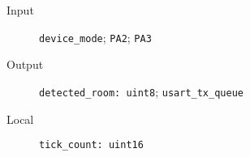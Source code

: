 \begin{flushleft}
  \begin{description}
    \item [Input]
      \verb#device_mode#;
      \verb#PA2#;
      \verb#PA3#
    \item [Output]
      \verb#detected_room: uint8#;
      \verb#usart_tx_queue#
    \item [Local]
      \verb#tick_count: uint16#
  \end{description}
\end{flushleft}
